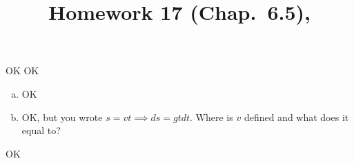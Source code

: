 \documentclass[10pt]{article} %
\title{Homework 17 (Chap.~6.5),
}
\begin{document}
\maketitle
{}
OK
OK
\begin{enumerate}[(a)]
	\item OK
	\item OK, but you wrote $s=vt\implies ds=gt dt$. Where is $v$ defined
		and what does it equal to?
\end{enumerate}
OK
\end{document}
